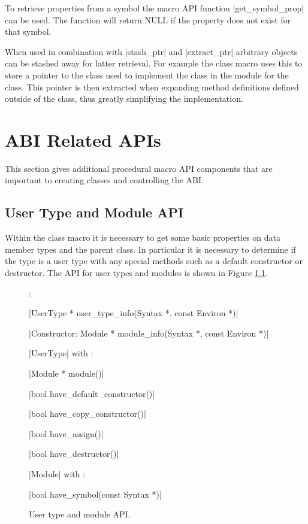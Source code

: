 To retrieve properties from a symbol the macro API function
|get_symbol_prop| can be used.  The function will return NULL if the
property does not exist for that symbol.

When used in combination with |stash_ptr| and |extract_ptr| arbitrary
objects can be stashed away for latter retrieval.  For example the
class macro uses this to store a pointer to the class used to
implement the class in the module for the class.  This pointer is then
extracted when expanding method definitions defined outside of the
class, thus greatly simplifying the implementation.

\chapter{ABI Related APIs}

This section gives additional procedural macro API components that are
important to creating classes and controlling the ABI.

\section{User Type and Module API}

Within the class macro it is necessary to get some basic properties on
data member types and the parent class.  In particular it is
necessary to determine if the type is a user type with any special
methods such as a default constructor or destructor.  The API for user
types and modules is shown in Figure \ref{module-api}.

\begin{figure}
\begin{apil}
\item {}:
\begin{apill}
\item |UserType * user_type_info(Syntax *, const Environ *)|
\item |Constructor: Module * module_info(Syntax *, const Environ *)|
\end{apill}
\item {} |UserType| with :
\begin{apill}
\item|Module * module()|
\item|bool have_default_constructor()|
\item|bool have_copy_constructor()|
\item|bool have_assign()|
\item|bool have_destructor()|
\end{apill}
\item {} |Module| with :
\begin{apill}
\item |bool have_symbol(const Syntax *)|
\end{apill}
\end{apil}
\caption{User type and module API.}
\label{module-api}
\end{figure}

